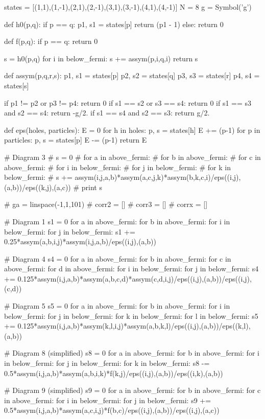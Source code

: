 \documentclass[%
twoside,                 %
final,                   %
10pt]{article}
\newenvironment{doconceexercise}{}{}
\begin{document}
\begin{doconceexercise}
states = [(1,1),(1,-1),(2,1),(2,-1),(3,1),(3,-1),(4,1),(4,-1)]
N = 8
g = Symbol('g')



def h0(p,q):
	if p == q:
		p1, s1 = states[p]
		return (p1 - 1)	
	else:
		return 0

def f(p,q):
	if p == q:
		return 0

	s = h0(p,q)
	for i in below_fermi:
		s += assym(p,i,q,i)
	return s


def assym(p,q,r,s):
	p1, s1 = states[p]
	p2, s2 = states[q]
	p3, s3 = states[r]
	p4, s4 = states[s]

	if p1 != p2 or p3 != p4:
		return 0
	if s1 == s2 or s3 == s4:
		return 0
	if s1 == s3 and s2 == s4:
		return -g/2.
	if s1 == s4 and s2 == s3:
		return g/2.

def eps(holes, particles):
	E = 0
	for h in holes:
		p, s = states[h]
		E += (p-1)
	for p in particles:
		p, s = states[p]
		E -= (p-1)
	return E


# Diagram 3
# s = 0 
# for a in above_fermi:
# 	for b in above_fermi:
# 		for c in above_fermi:
# 			for i in below_fermi:
# 				for j in below_fermi:
# 					for k in below_fermi:
# 						s += assym(i,j,a,b)*assym(a,c,j,k)*assym(b,k,c,i)/eps((i,j),(a,b))/eps((k,j),(a,c))
# print s


# ga = linspace(-1,1,101)
# corr2 = []
# corr3 = []
# corrx = []


# Diagram 1
s1 = 0
for a in above_fermi:
	for b in above_fermi:
		for i in below_fermi:
			for j in below_fermi:
				s1 += 0.25*assym(a,b,i,j)*assym(i,j,a,b)/eps((i,j),(a,b))

# Diagram 4
s4 = 0
for a in above_fermi:
	for b in above_fermi:
		for c in above_fermi:
			for d in above_fermi:
				for i in below_fermi:
					for j in below_fermi:
						s4 += 0.125*assym(i,j,a,b)*assym(a,b,c,d)*assym(c,d,i,j)/eps((i,j),(a,b))/eps((i,j),(c,d))

# Diagram 5
s5 = 0
for a in above_fermi:
	for b in above_fermi:
		for i in below_fermi:
			for j in below_fermi:
				for k in below_fermi:
					for l in below_fermi:
						s5 += 0.125*assym(i,j,a,b)*assym(k,l,i,j)*assym(a,b,k,l)/eps((i,j),(a,b))/eps((k,l),(a,b))

# Diagram 8 (simplified)
s8 = 0 
for a in above_fermi:
	for b in above_fermi:
		for i in below_fermi:
			for j in below_fermi:
				for k in below_fermi:
					s8 -= 0.5*assym(i,j,a,b)*assym(a,b,i,k)*f(k,j)/eps((i,j),(a,b))/eps((i,k),(a,b))

# Diagram 9 (simplified)
s9 = 0 
for a in above_fermi:
	for b in above_fermi:
		for c in above_fermi:
			for i in below_fermi:
				for j in below_fermi:
					s9 += 0.5*assym(i,j,a,b)*assym(a,c,i,j)*f(b,c)/eps((i,j),(a,b))/eps((i,j),(a,c))



\end{doconceexercise}
\end{document}
